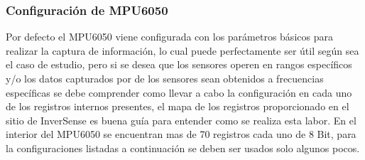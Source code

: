 \documentclass[12pt,a4paper]{article}
\begin{document}
			\subsubsection{Configuración de MPU6050}
			Por defecto el MPU6050 viene configurada con los parámetros básicos para realizar la captura de información, lo cual puede perfectamente ser útil según sea el caso de estudio, pero si se desea que los sensores operen en rangos específicos y/o los datos capturados por de los sensores sean obtenidos a frecuencias específicas se debe comprender como llevar a cabo la configuración en cada uno de los registros internos presentes, el mapa de los registros \cite{MAPREGISTER} proporcionado  en el sitio de InverSense es buena guía para entender como se realiza esta labor.
			\newline En el interior del MPU6050 se encuentran mas de 70 registros cada uno de 8 Bit, para la configuraciones listadas a continuación se deben ser usados solo algunos pocos.
\end{document}
